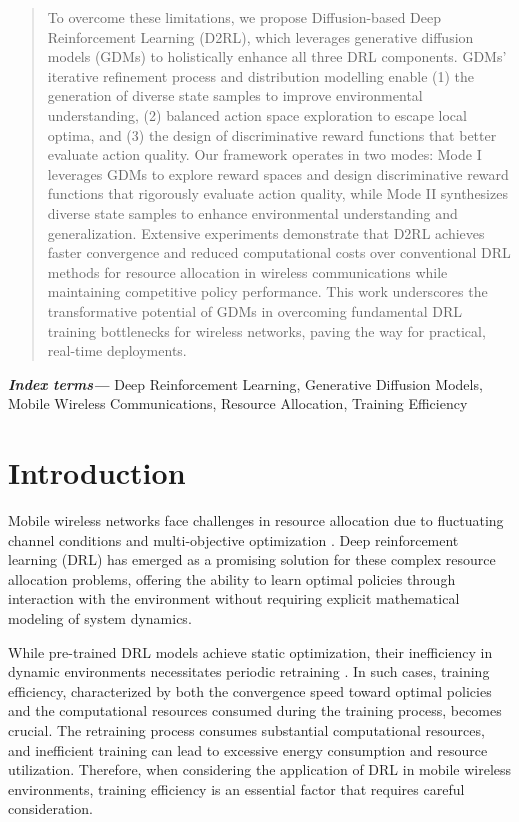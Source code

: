 \documentclass[comsoc,journal]{IEEEtran}
\providecommand{\keywords}[1]{\textbf{\textit{Index terms---}} #1}
\begin{document}
\begin{abstract}
To overcome these limitations, we propose Diffusion-based Deep Reinforcement Learning (D2RL), which leverages generative diffusion models (GDMs) to holistically enhance all three DRL components. GDMs’ iterative refinement process and distribution modelling enable (1) the generation of diverse state samples to improve environmental understanding, (2) balanced action space exploration to escape local optima, and (3) the design of discriminative reward functions that better evaluate action quality. Our framework operates in two modes: Mode I leverages GDMs to explore reward spaces and design discriminative reward functions that rigorously evaluate action quality, while Mode II synthesizes diverse state samples to enhance environmental understanding and generalization. Extensive experiments demonstrate that D2RL achieves faster convergence and reduced computational costs over conventional DRL methods for resource allocation in wireless communications while maintaining competitive policy performance. This work underscores the transformative potential of GDMs in overcoming fundamental DRL training bottlenecks for wireless networks, paving the way for practical, real-time deployments.

\end{abstract}

\keywords{Deep Reinforcement Learning, Generative Diffusion Models, Mobile Wireless Communications, Resource Allocation, Training Efficiency}


\section{Introduction}
\label{sec:intro}


Mobile wireless networks face challenges in resource allocation due to fluctuating channel conditions and multi-objective optimization \cite{hieu2021optimal,gao2024uav}. Deep reinforcement learning (DRL) has emerged as a promising solution for these complex resource allocation problems, offering the ability to learn optimal policies through interaction with the environment without requiring explicit mathematical modeling of system dynamics\cite{he2023full,chauhan2024full,nayak2024drl}.

While pre-trained DRL models achieve static optimization\cite{kumar2020conservative, agarwal2020optimistic}, their inefficiency in dynamic environments necessitates periodic retraining \cite{muhammad2021deep}. In such cases, training efficiency, characterized by both the convergence speed toward optimal policies and the computational resources consumed during the training process, becomes crucial\cite{jin2022vwp}. The retraining process consumes substantial computational resources, and inefficient training can lead to excessive energy consumption and resource utilization. Therefore, when considering the application of DRL in mobile wireless environments, training efficiency is an essential factor that requires careful consideration.
\end{document}
